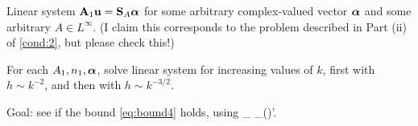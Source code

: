 \item Linear system $\mathbf{A}_{1} \mathbf{u} = \mathbf{S}_{A} {\boldsymbol{\alpha}}$ for some arbitrary complex-valued vector ${\boldsymbol{\alpha}}$ and some arbitrary $A\in L^\infty$. (I claim this corresponds to the problem described in Part (ii) of \cref{cond:2},  but please check this!)
\item For each $A_{1}, n_{1}, {\boldsymbol{\alpha}}$, solve linear system for increasing values of $k$, first with $h\sim k^{-2}$, and then with $h\sim k^{-3/2}$.
\item Goal: see if the bound \cref{eq:bound4} holds, using 
\beqs
{}_{\LtDR} \quad {} \quad {}_{(\HokDR)'}.
\eeqs
\eit
\een

